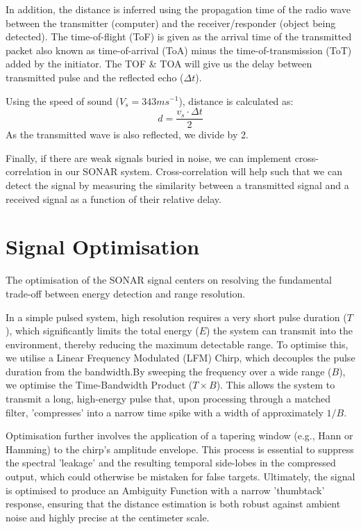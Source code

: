 \documentclass[11pt, a4paper]{article}
\begin{document}
\noindent In addition, the distance is inferred using the propagation time of the radio wave between the transmitter (computer) and the receiver/responder (object being detected). The time-of-flight (ToF) is given as the arrival time of the transmitted packet also known as time-of-arrival (ToA) minus the time-of-transmission (ToT) added by the initiator. The TOF \& TOA will give us the delay between transmitted pulse and the reflected echo ($\Delta t$).

\vspace{1\baselineskip}

\noindent Using the speed of sound ($V_s = 343ms^{-1}$), distance is calculated as:
\[
d = \frac{v_s \cdot \Delta t}{2}
\]
As the transmitted wave is also reflected, we divide by 2.

\vspace{1\baselineskip}

\noindent Finally, if there are weak signals buried in noise, we can implement cross-correlation in our SONAR system. Cross-correlation will help such that we can detect the signal by measuring the similarity between a transmitted signal and a received signal as a function of their relative delay.

\section{Signal Optimisation}

The optimisation of the SONAR signal centers on resolving the fundamental trade-off between energy detection and range resolution. 

\vspace{1\baselineskip}

\noindent In a simple pulsed system, high resolution requires a very short pulse duration ($T$), which significantly limits the total energy ($E$) the system can transmit into the environment, thereby reducing the maximum detectable range. To optimise this, we utilise a Linear Frequency Modulated (LFM) Chirp, which decouples the pulse duration from the bandwidth.By sweeping the frequency over a wide range ($B$), we optimise the Time-Bandwidth Product ($T \times B$). This allows the system to transmit a long, high-energy pulse that, upon processing through a matched filter, 'compresses' into a narrow time spike with a width of approximately $1/B$. 

\vspace{1\baselineskip}

\noindent Optimisation further involves the application of a tapering window (e.g., Hann or Hamming) to the chirp's amplitude envelope. This process is essential to suppress the spectral 'leakage' and the resulting temporal side-lobes in the compressed output, which could otherwise be mistaken for false targets. Ultimately, the signal is optimised to produce an Ambiguity Function with a narrow 'thumbtack' response, ensuring that the distance estimation is both robust against ambient noise and highly precise at the centimeter scale.
\end{document}
